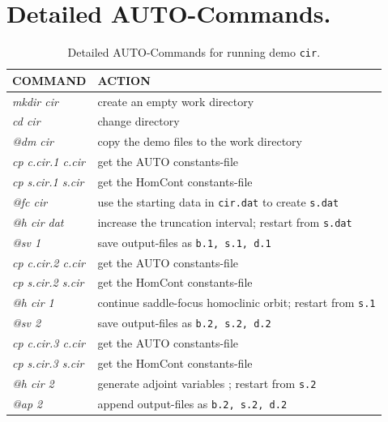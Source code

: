 \documentclass[12pt]{report}
\begin{document}
\section{ Detailed {\cal AUTO}-Commands.}
\begin{table}[htbp]
\begin{center}
\begin{tabular}{| l | l |}
\hline
  COMMAND  & ACTION \\
\hline
  {\it mkdir cir} & create an empty work directory \\ 
  {\it cd cir} & change directory \\
  {\it @dm cir} & copy the demo files to the work directory \\
\hline
  {\it cp c.cir.1 c.cir} & get the AUTO constants-file \\ 
  {\it cp s.cir.1 s.cir} & get the HomCont constants-file \\ 
  {\it @fc cir} & use the starting data in {\tt cir.dat} to create {\tt s.dat} \\ 
  {\it @h cir dat} &  increase the truncation interval; restart from {\tt s.dat}\\ 
  {\it @sv 1} & save output-files as {\tt b.1, s.1, d.1} \\ 
\hline
  {\it cp c.cir.2 c.cir} & get the AUTO constants-file \\ 
  {\it cp s.cir.2 s.cir} & get the HomCont constants-file \\ 
  {\it @h cir 1} &  continue saddle-focus homoclinic orbit; restart from {\tt s.1} \\ 
  {\it @sv 2} & save output-files as {\tt b.2, s.2, d.2} \\ 
\hline
  {\it cp c.cir.3 c.cir} & get the AUTO constants-file \\ 
  {\it cp s.cir.3 s.cir} & get the HomCont constants-file \\ 
  {\it @h cir 2} & generate adjoint variables  ; restart from {\tt s.2} \\ 
  {\it @ap 2} & append output-files as {\tt b.2, s.2, d.2} \\ 
\hline
\end{tabular}
\caption{Detailed {\cal AUTO}-Commands for running demo {\tt cir}.}
\label{tbl:demo_cir_1}
\end{center}
\end{table}
\end{document}
